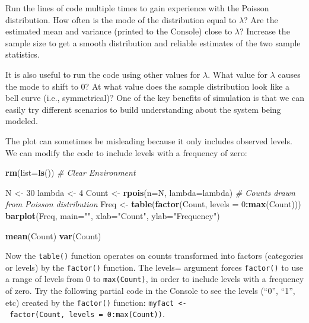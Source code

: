 \documentclass[
]{krantz}
\makeatletter
\newenvironment{Shaded}{\begin{snugshade}}{\end{snugshade}}
\newcommand{\AttributeTok}[1]{\textcolor[rgb]{0.27,0.27,0.27}{#1}}
\newcommand{\CommentTok}[1]{\textcolor[rgb]{0.37,0.37,0.37}{\textit{#1}}}
\newcommand{\DecValTok}[1]{\textcolor[rgb]{0.06,0.06,0.06}{#1}}
\newcommand{\FunctionTok}[1]{\textcolor[rgb]{0.27,0.27,0.27}{\textbf{#1}}}
\newcommand{\NormalTok}[1]{#1}
\newcommand{\OtherTok}[1]{\textcolor[rgb]{0.37,0.37,0.37}{#1}}
\newcommand{\SpecialCharTok}[1]{\textcolor[rgb]{0.43,0.43,0.43}{\textbf{#1}}}
\newcommand{\StringTok}[1]{\textcolor[rgb]{0.5,0.5,0.5}{#1}}
\newenvironment{kframe}{%
\medskip{}
\setlength{\fboxsep}{.8em}
 \def\at@end@of@kframe{}%
 \ifinner\ifhmode%
  \def\at@end@of@kframe{\end{minipage}}%
  \begin{minipage}{\columnwidth}%
 \fi\fi%
 \def\FrameCommand##1{\hskip\@totalleftmargin \hskip-\fboxsep
 \colorbox{shadecolor}{##1}\hskip-\fboxsep
     \hskip-\linewidth \hskip-\@totalleftmargin \hskip\columnwidth}%
 \MakeFramed {\advance\hsize-\width
   \@totalleftmargin\z@ \linewidth\hsize
   \@setminipage}}%
 {\par\unskip\endMakeFramed%
 \at@end@of@kframe}
\renewenvironment{Shaded}{\begin{kframe}}{\end{kframe}}
\makeatother
\begin{document}
Run the lines of code multiple times to gain experience with the Poisson distribution. How often is the mode of the distribution equal to \(\lambda\)? Are the estimated mean and variance (printed to the Console) close to \(\lambda\)? Increase the sample size to get a smooth distribution and reliable estimates of the two sample statistics.

It is also useful to run the code using other values for \(\lambda\). What value for \(\lambda\) causes the mode to shift to 0? At what value does the sample distribution look like a bell curve (i.e., symmetrical)? One of the key benefits of simulation is that we can easily try different scenarios to build understanding about the system being modeled.

The plot can sometimes be misleading because it only includes observed levels. We can modify the code to include levels with a frequency of zero:

\begin{Shaded}
\begin{Highlighting}[]
\FunctionTok{rm}\NormalTok{(}\AttributeTok{list=}\FunctionTok{ls}\NormalTok{()) }\CommentTok{\# Clear Environment}

\NormalTok{N }\OtherTok{\textless{}{-}} \DecValTok{30}
\NormalTok{lambda }\OtherTok{\textless{}{-}} \DecValTok{4}
\NormalTok{Count }\OtherTok{\textless{}{-}} \FunctionTok{rpois}\NormalTok{(}\AttributeTok{n=}\NormalTok{N, }\AttributeTok{lambda=}\NormalTok{lambda) }\CommentTok{\# Counts drawn from Poisson distribution}
\NormalTok{Freq }\OtherTok{\textless{}{-}} \FunctionTok{table}\NormalTok{(}\FunctionTok{factor}\NormalTok{(Count, }\AttributeTok{levels =} \DecValTok{0}\SpecialCharTok{:}\FunctionTok{max}\NormalTok{(Count)))}
\FunctionTok{barplot}\NormalTok{(Freq, }\AttributeTok{main=}\StringTok{""}\NormalTok{, }\AttributeTok{xlab=}\StringTok{"Count"}\NormalTok{, }\AttributeTok{ylab=}\StringTok{"Frequency"}\NormalTok{)}

\FunctionTok{mean}\NormalTok{(Count)}
\FunctionTok{var}\NormalTok{(Count)}
\end{Highlighting}
\end{Shaded}

Now the \texttt{table()} function operates on counts transformed into factors (categories or levels) by the \texttt{factor()} function. The levels= argument forces \texttt{factor()} to use a range of levels from 0 to \texttt{max(Count)}, in order to include levels with a frequency of zero. Try the following partial code in the Console to see the levels (``0'', ``1'', etc) created by the \texttt{factor()} function: \texttt{myfact\ \textless{}-\ factor(Count,\ levels\ =\ 0:max(Count))}.
\end{document}
